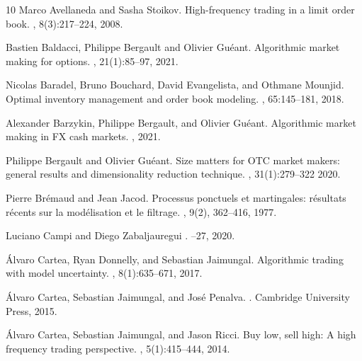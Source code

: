 \documentclass[preprint, 3p]{elsarticle}
\newcommand{\1}{{\chi}}
\begin{document}
% 
% 
\begin{thebibliography}{10}
Marco Avellaneda and Sasha Stoikov.
\newblock High-frequency trading in a limit order book.
, 8(3):217--224, 2008.

Bastien Baldacci, Philippe Bergault and Olivier Guéant.
  \newblock Algorithmic market making for options.
  , 21(1):85--97, 2021.

Nicolas Baradel, Bruno Bouchard, David Evangelista, and Othmane Mounjid.
\newblock Optimal inventory management and order book modeling.
, 65:145--181, 2018.

Alexander Barzykin, Philippe Bergault, and Olivier Gu\'eant.
\newblock Algorithmic market making in FX cash markets.
, 2021.

Philippe Bergault and Olivier Gu{\'e}ant.
\newblock Size matters for OTC market makers: general results and
  dimensionality reduction technique.
,  31(1):279--322 2020.

Pierre Brémaud and Jean Jacod.
Processus ponctuels et martingales: résultats récents sur la modélisation et le filtrage.
, 9(2), 362--416, 1977.

Luciano Campi and Diego Zabaljauregui
.
--27, 2020.

{\'A}lvaro Cartea, Ryan Donnelly, and Sebastian Jaimungal.
\newblock Algorithmic trading with model uncertainty.
, 8(1):635--671, 2017.

{\'A}lvaro Cartea, Sebastian Jaimungal, and Jos{\'e} Penalva.
.
\newblock Cambridge University Press, 2015.

{\'A}lvaro Cartea, Sebastian Jaimungal, and Jason Ricci.
\newblock Buy low, sell high: A high frequency trading perspective.
, 5(1):415--444, 2014.


\end{thebibliography}
\end{document}
